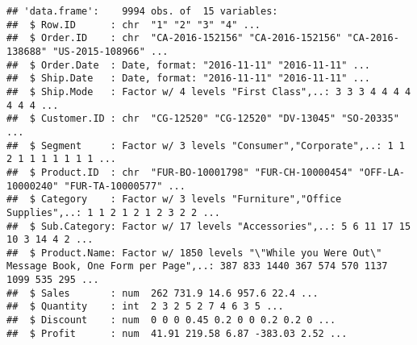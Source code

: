\documentclass[
]{article}
\newenvironment{Shaded}{\begin{snugshade}}{\end{snugshade}}
\newcommand{\AttributeTok}[1]{\textcolor[rgb]{0.77,0.63,0.00}{#1}}
\newcommand{\FunctionTok}[1]{\textcolor[rgb]{0.00,0.00,0.00}{#1}}
\newcommand{\NormalTok}[1]{#1}
\newcommand{\OtherTok}[1]{\textcolor[rgb]{0.56,0.35,0.01}{#1}}
\newcommand{\SpecialCharTok}[1]{\textcolor[rgb]{0.00,0.00,0.00}{#1}}
\newcommand{\StringTok}[1]{\textcolor[rgb]{0.31,0.60,0.02}{#1}}
\begin{document}
\begin{Shaded}
\end{Shaded}

\begin{verbatim}
## 'data.frame':    9994 obs. of  15 variables:
##  $ Row.ID      : chr  "1" "2" "3" "4" ...
##  $ Order.ID    : chr  "CA-2016-152156" "CA-2016-152156" "CA-2016-138688" "US-2015-108966" ...
##  $ Order.Date  : Date, format: "2016-11-11" "2016-11-11" ...
##  $ Ship.Date   : Date, format: "2016-11-11" "2016-11-11" ...
##  $ Ship.Mode   : Factor w/ 4 levels "First Class",..: 3 3 3 4 4 4 4 4 4 4 ...
##  $ Customer.ID : chr  "CG-12520" "CG-12520" "DV-13045" "SO-20335" ...
##  $ Segment     : Factor w/ 3 levels "Consumer","Corporate",..: 1 1 2 1 1 1 1 1 1 1 ...
##  $ Product.ID  : chr  "FUR-BO-10001798" "FUR-CH-10000454" "OFF-LA-10000240" "FUR-TA-10000577" ...
##  $ Category    : Factor w/ 3 levels "Furniture","Office Supplies",..: 1 1 2 1 2 1 2 3 2 2 ...
##  $ Sub.Category: Factor w/ 17 levels "Accessories",..: 5 6 11 17 15 10 3 14 4 2 ...
##  $ Product.Name: Factor w/ 1850 levels "\"While you Were Out\" Message Book, One Form per Page",..: 387 833 1440 367 574 570 1137 1099 535 295 ...
##  $ Sales       : num  262 731.9 14.6 957.6 22.4 ...
##  $ Quantity    : int  2 3 2 5 2 7 4 6 3 5 ...
##  $ Discount    : num  0 0 0 0.45 0.2 0 0 0.2 0.2 0 ...
##  $ Profit      : num  41.91 219.58 6.87 -383.03 2.52 ...
\end{verbatim}
\end{document}
